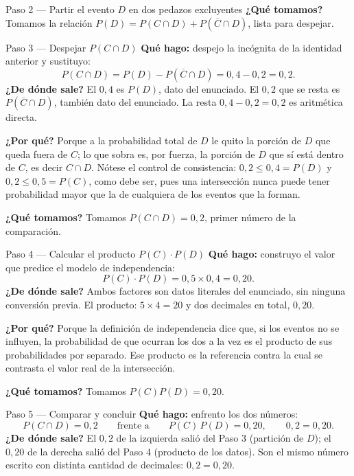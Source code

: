 \documentclass[11pt]{article}
\begin{document}
\begin{sol}
\begin{paso}{Paso 2 --- Partir el evento $D$ en dos pedazos excluyentes}
\textbf{¿Qué tomamos?} Tomamos la relación $P(D)=P(C\cap D)+P(\overline{C}\cap D)$, lista
para despejar.
\end{paso}

\begin{paso}{Paso 3 --- Despejar $P(C\cap D)$}
\textbf{Qué hago:} despejo la incógnita de la identidad anterior y sustituyo:
\[
P(C\cap D)=P(D)-P(\overline{C}\cap D)=0{,}4-0{,}2=0{,}2 .
\]
\textbf{¿De dónde sale?} El $0{,}4$ es $P(D)$, dato del enunciado. El $0{,}2$ que se resta es
$P(\overline{C}\cap D)$, también dato del enunciado. La resta $0{,}4-0{,}2=0{,}2$ es
aritmética directa.

\textbf{¿Por qué?} Porque a la probabilidad total de $D$ le quito la porción de $D$ que queda
fuera de $C$; lo que sobra es, por fuerza, la porción de $D$ que sí está dentro de $C$, es
decir $C\cap D$. Nótese el control de consistencia: $0{,}2\le 0{,}4=P(D)$ y
$0{,}2\le 0{,}5=P(C)$, como debe ser, pues una intersección nunca puede tener probabilidad
mayor que la de cualquiera de los eventos que la forman.

\textbf{¿Qué tomamos?} Tomamos $P(C\cap D)=0{,}2$, primer número de la comparación.
\end{paso}

\begin{paso}{Paso 4 --- Calcular el producto $P(C)\cdot P(D)$}
\textbf{Qué hago:} construyo el valor que predice el modelo de independencia:
\[
P(C)\cdot P(D)=0{,}5\times 0{,}4=0{,}20 .
\]
\textbf{¿De dónde sale?} Ambos factores son datos literales del enunciado, sin ninguna
conversión previa. El producto: $5\times 4=20$ y dos decimales en total, $0{,}20$.

\textbf{¿Por qué?} Porque la definición de independencia dice que, si los eventos no se
influyen, la probabilidad de que ocurran los dos a la vez es el producto de sus
probabilidades por separado. Ese producto es la referencia contra la cual se contrasta el
valor real de la intersección.

\textbf{¿Qué tomamos?} Tomamos $P(C)P(D)=0{,}20$.
\end{paso}

\begin{paso}{Paso 5 --- Comparar y concluir}
\textbf{Qué hago:} enfrento los dos números:
\[
P(C\cap D)=0{,}2
\qquad\text{frente a}\qquad
P(C)\,P(D)=0{,}20,
\qquad 0{,}2=0{,}20 .
\]
\textbf{¿De dónde sale?} El $0{,}2$ de la izquierda salió del Paso 3 (partición de $D$); el
$0{,}20$ de la derecha salió del Paso 4 (producto de los datos). Son el mismo número escrito
con distinta cantidad de decimales: $0{,}2=0{,}20$.


\end{paso}
\end{sol}
\end{document}
